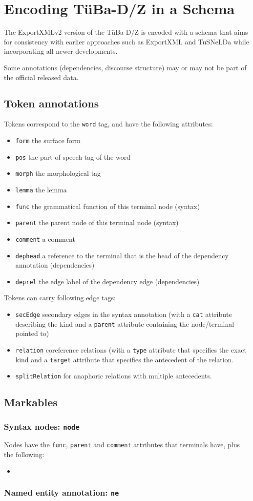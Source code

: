 \documentclass[a4paper,11pt]{report}
\begin{document}
\chapter{Encoding TüBa-D/Z in a Schema}
The ExportXMLv2 version of the TüBa-D/Z is encoded with a schema
that aims for consistency with earlier approaches such as ExportXML
and TuSNeLDa while incorporating all newer developments.

Some annotations (dependencies, discourse structure) may or may not be part
of the official released data.

\section{Token annotations}
Tokens correspond to the \texttt{word} tag, and have the following attributes:
\begin{itemize}
\item \texttt{form} the surface form
\item \texttt{pos} the part-of-speech tag of the word
\item \texttt{morph} the morphological tag
\item \texttt{lemma} the lemma
\item \texttt{func} the grammatical function of this terminal node (syntax)
\item \texttt{parent} the parent node of this terminal node (syntax)
\item \texttt{comment} a comment
\item \texttt{dephead} a reference to the terminal that is the head of the
  dependency annotation (dependencies)
\item \texttt{deprel} the edge label of the dependency edge (dependencies)
\end{itemize}

Tokens can carry following edge tags:
\begin{itemize}
\item \texttt{secEdge} secondary edges in the syntax annotation (with a \texttt{cat} attribute describing
the kind and a \texttt{parent} attribute containing the node/terminal pointed to)
\item \texttt{relation} coreference relations (with a \texttt{type} attribute that specifies the
exact kind and a \texttt{target} attribute that specifies the antecedent of the relation.
\item \texttt{splitRelation} for anaphoric relations with multiple antecedents.
\end{itemize}

\section{Markables}
\subsection{Syntax nodes: \texttt{node}}
Nodes have the \texttt{func}, \texttt{parent} and \texttt{comment}
attributes that terminals have, plus the following:
\begin{itemize}
\item 
\end{itemize}
\subsection{Named entity annotation: \texttt{ne}}
\end{document}
